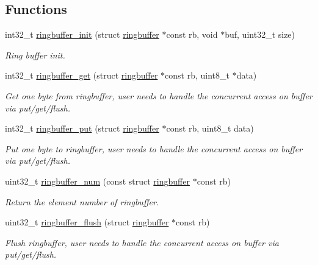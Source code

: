 \subsection*{Functions}
\begin{DoxyCompactItemize}
\item 
int32\+\_\+t \hyperlink{group__doc__driver__hal__utils__ringbuffer_ga3a02282691d4059ff63caf89b946fbfd}{ringbuffer\+\_\+init} (struct \hyperlink{structringbuffer}{ringbuffer} $\ast$const rb, void $\ast$buf, uint32\+\_\+t size)
\begin{DoxyCompactList}\small\item\em Ring buffer init. \end{DoxyCompactList}\item 
int32\+\_\+t \hyperlink{group__doc__driver__hal__utils__ringbuffer_ga46163f27edc3b85af50cbc4579e2e8aa}{ringbuffer\+\_\+get} (struct \hyperlink{structringbuffer}{ringbuffer} $\ast$const rb, uint8\+\_\+t $\ast$data)
\begin{DoxyCompactList}\small\item\em Get one byte from ringbuffer, user needs to handle the concurrent access on buffer via put/get/flush. \end{DoxyCompactList}\item 
int32\+\_\+t \hyperlink{group__doc__driver__hal__utils__ringbuffer_ga57c5e4794358ac7f4592fe10c8fccb39}{ringbuffer\+\_\+put} (struct \hyperlink{structringbuffer}{ringbuffer} $\ast$const rb, uint8\+\_\+t data)
\begin{DoxyCompactList}\small\item\em Put one byte to ringbuffer, user needs to handle the concurrent access on buffer via put/get/flush. \end{DoxyCompactList}\item 
uint32\+\_\+t \hyperlink{group__doc__driver__hal__utils__ringbuffer_ga3b4f3772fa2886e7f9429895c1044409}{ringbuffer\+\_\+num} (const struct \hyperlink{structringbuffer}{ringbuffer} $\ast$const rb)
\begin{DoxyCompactList}\small\item\em Return the element number of ringbuffer. \end{DoxyCompactList}\item 
uint32\+\_\+t \hyperlink{group__doc__driver__hal__utils__ringbuffer_ga804ce09a6a02d883da66618ff16cd8f0}{ringbuffer\+\_\+flush} (struct \hyperlink{structringbuffer}{ringbuffer} $\ast$const rb)
\begin{DoxyCompactList}\small\item\em Flush ringbuffer, user needs to handle the concurrent access on buffer via put/get/flush. \end{DoxyCompactList}\end{DoxyCompactItemize}


